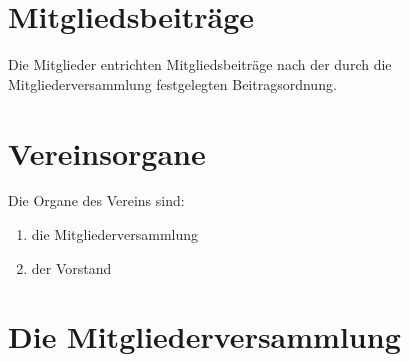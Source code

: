 \documentclass[a4paper, 12pt]{scrartcl}
\begin{document}
\section{Mitgliedsbeiträge}
Die Mitglieder entrichten Mitgliedsbeiträge nach der durch die Mitgliederversammlung festgelegten Beitragsordnung.

\section{Vereinsorgane}
Die Organe des Vereins sind:
\begin{enumerate}
  \item die Mitgliederversammlung
  \item der Vorstand
\end{enumerate}

\section{Die Mitgliederversammlung}
\end{document}
